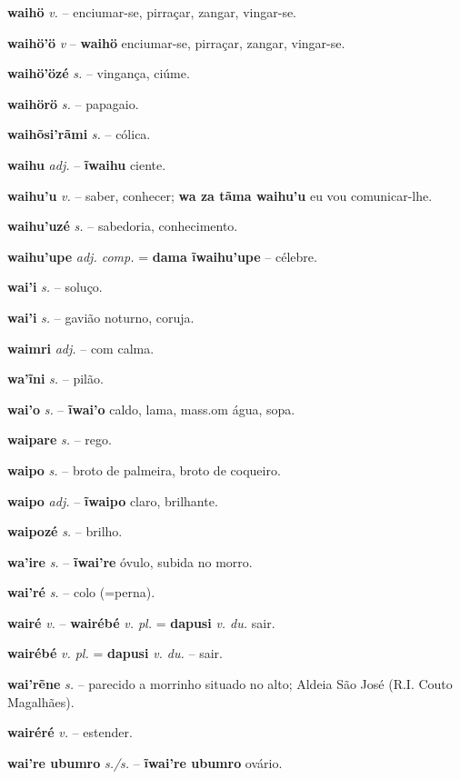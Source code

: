 \textbf{waihö} \textit{v.} -- enciumar-se, pirraçar, zangar, vingar-se.

\textbf{waihö'ö} \textit{v} -- \textbf{waihö} enciumar-se, pirraçar, zangar, vingar-se.

\textbf{waihö'özé} \textit{s.} -- vingança, ciúme.

\textbf{waihörö} \textit{s.} -- papagaio.

\textbf{waihõsi'rãmi} \textit{s.} -- cólica.

\textbf{waihu} \textit{adj.} -- \textbf{ĩwaihu} ciente.

\textbf{waihu'u} \textit{v.} -- saber, conhecer; \textbf{wa za tãma waihu'u} eu vou comunicar-lhe.

\textbf{waihu'uzé} \textit{s.} -- sabedoria, conhecimento.

\textbf{waihu'upe} \textit{adj. comp.} = \textbf{dama ĩwaihu'upe} -- célebre.

\textbf{wai'i} \textit{s.} -- soluço.

\textbf{wai'i} \textit{s.} -- gavião noturno, coruja.

\textbf{waimri} \textit{adj.} -- com calma.

\textbf{wa'ĩni} \textit{s.} -- pilão.

\textbf{wai'o} \textit{s.} -- \textbf{ĩwai'o} caldo, lama, mass.om água, sopa.

\textbf{waipare} \textit{s.} -- rego.

\textbf{waipo} \textit{s.} -- broto de palmeira, broto de coqueiro.

\textbf{waipo} \textit{adj.} -- \textbf{ĩwaipo} claro, brilhante.

\textbf{waipozé} \textit{s.} -- brilho.

\textbf{wa'ire} \textit{s.} -- \textbf{ĩwai're} óvulo, subida no morro.

\textbf{wai'ré} \textit{s.} -- colo (=perna).

\textbf{wairé} \textit{v.} -- \textbf{wairébé} \textit{v. pl.} = \textbf{dapusi} \textit{v. du.} sair.

\textbf{wairébé} \textit{v. pl.} = \textbf{dapusi} \textit{v. du.} -- sair.

\textbf{wai'rẽne} \textit{s.} -- parecido a morrinho situado no alto; Aldeia São José (R.I. Couto Magalhães).

\textbf{wairéré} \textit{v.} -- estender.

\textbf{wai're ubumro} \textit{s./s.} -- \textbf{ĩwai're ubumro} ovário.

